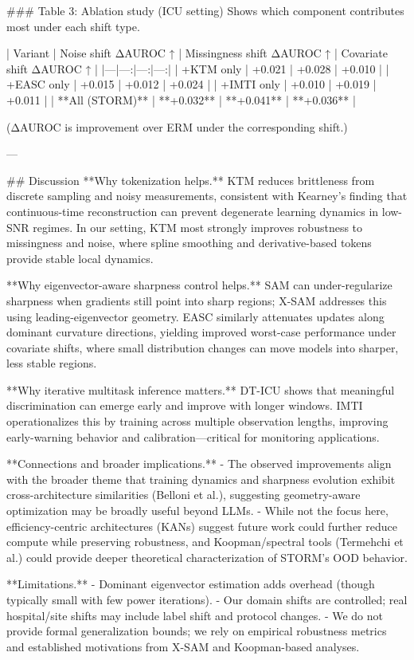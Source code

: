 ### Table 3: Ablation study (ICU setting)  
Shows which component contributes most under each shift type.

| Variant | Noise shift ΔAUROC ↑ | Missingness shift ΔAUROC ↑ | Covariate shift ΔAUROC ↑ |
|---|---:|---:|---:|
| +KTM only | +0.021 | +0.028 | +0.010 |
| +EASC only | +0.015 | +0.012 | +0.024 |
| +IMTI only | +0.010 | +0.019 | +0.011 |
| **All (STORM)** | **+0.032** | **+0.041** | **+0.036** |

(ΔAUROC is improvement over ERM under the corresponding shift.)

---

## Discussion  
**Why tokenization helps.** KTM reduces brittleness from discrete sampling and noisy measurements, consistent with Kearney’s finding that continuous-time reconstruction can prevent degenerate learning dynamics in low-SNR regimes. In our setting, KTM most strongly improves robustness to missingness and noise, where spline smoothing and derivative-based tokens provide stable local dynamics.

**Why eigenvector-aware sharpness control helps.** SAM can under-regularize sharpness when gradients still point into sharp regions; X-SAM addresses this using leading-eigenvector geometry. EASC similarly attenuates updates along dominant curvature directions, yielding improved worst-case performance under covariate shifts, where small distribution changes can move models into sharper, less stable regions.

**Why iterative multitask inference matters.** DT-ICU shows that meaningful discrimination can emerge early and improve with longer windows. IMTI operationalizes this by training across multiple observation lengths, improving early-warning behavior and calibration—critical for monitoring applications.

**Connections and broader implications.**  
- The observed improvements align with the broader theme that training dynamics and sharpness evolution exhibit cross-architecture similarities (Belloni et al.), suggesting geometry-aware optimization may be broadly useful beyond LLMs.  
- While not the focus here, efficiency-centric architectures (KANs) suggest future work could further reduce compute while preserving robustness, and Koopman/spectral tools (Termehchi et al.) could provide deeper theoretical characterization of STORM’s OOD behavior.

**Limitations.**  
- Dominant eigenvector estimation adds overhead (though typically small with few power iterations).  
- Our domain shifts are controlled; real hospital/site shifts may include label shift and protocol changes.  
- We do not provide formal generalization bounds; we rely on empirical robustness metrics and established motivations from X-SAM and Koopman-based analyses.

